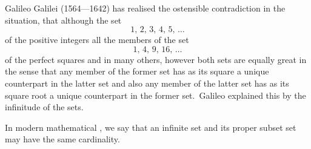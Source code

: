 \documentclass[12pt]{article}
\theoremstyle{definition}
\begin{document}
Galileo Galilei (1564---1642) has realised the ostensible contradiction in the situation, that although the set
$$1,\,2,\,3,\,4,\,5,\,\ldots$$
of the positive integers  all the members of the set
$$1,\,4,\,9,\,16,\,\ldots$$
of the perfect squares and in  many others, however both sets are equally great in the sense that any member of the former set has as its square a unique counterpart in the latter set and also any member of the latter set has as its square root a unique counterpart in the former set.\, Galileo explained this by the infinitude of the sets.

In modern mathematical , we say that an infinite set and its proper subset set may have the same cardinality.

\end{document}
